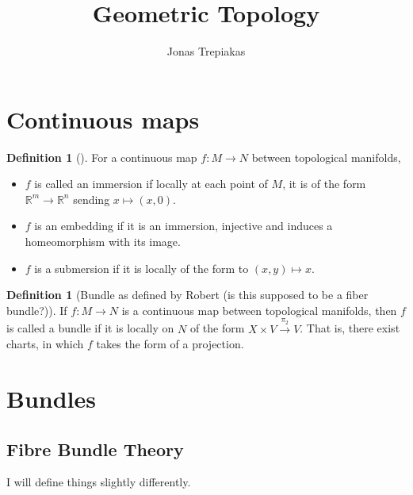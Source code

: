 \documentclass[reqno]{amsart}
\title{Geometric Topology}
\author{Jonas Trepiakas}
\date{}
\theoremstyle{definition}
\newtheorem{definition}[theorem]{Definition}
\theoremstyle{remark}
\begin{document}
\maketitle

\tableofcontents



\section{Continuous maps}


    \begin{definition}[]
        For a continuous map $f \colon M \to N$ between 
        topological manifolds,
        \begin{itemize}
            \item $f$ is called
                an immersion if
                locally at each point of $M$,
                it is of the form
                $\mathbb{R}^{m} \to \mathbb{R}^{n}$ 
                sending $x \mapsto \left( x,0 \right) $.
            \item $f$ is an embedding if it is
                an immersion, injective and induces a homeomorphism
                with
                its image.
            \item $f$ is a submersion if it is locally
                of the form to
                $\left( x,y \right) \mapsto x$.
        \end{itemize}
    \end{definition}

    \begin{definition}[Bundle as defined by
        Robert (is this supposed to be a fiber bundle?)]
        If 
        $f \colon M \to N$ is a continuous
        map between topological manifolds, then
        $f$ is called a bundle if it is locally
        on $N$ of the form
        $X \times V \stackrel{\pi_2}{\to } V$.
        That is, there
        exist charts, in which
        $f$ takes the form of a projection.
    \end{definition}




    \section{Bundles}

    \subsection{Fibre Bundle Theory}
    I will define things slightly differently.
\end{document}
